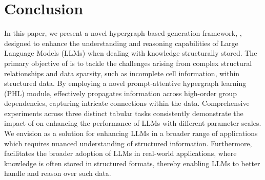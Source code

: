 \section{Conclusion}
In this paper, we present a novel hypergraph-based generation framework, \name, designed to enhance the understanding and reasoning capabilities of Large Language Models (LLMs) when dealing with knowledge structurally stored. The primary objective of \name is to tackle the challenges arising from complex structural relationships and data sparsity, such as incomplete cell information, within structured data. By employing a novel prompt-attentive hypergraph learning (PHL) module, \name effectively propagates information across high-order group dependencies, capturing intricate connections within the data. Comprehensive experiments across three distinct tabular tasks consistently demonstrate the impact of \name on enhancing the performance of LLMs with different parameter scales. We envision \name as a solution for enhancing LLMs in a broader range of applications which requires nuanced understanding of structured information. Furthermore, \name facilitates the broader adoption of LLMs in real-world applications, where knowledge is often stored in structured formats, thereby enabling LLMs to better handle and reason over such data.